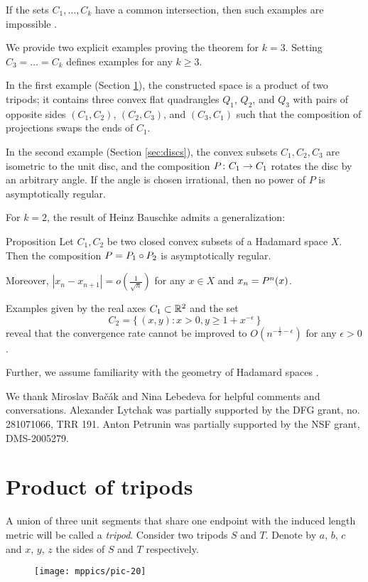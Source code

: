 \documentclass[a4paper,10pt]{article}
\begin{document}
If the sets $C_1,\dots,C_k$ have a common intersection, then such examples are impossible \cite{asymptotic,Bac2,Bac}.

We provide two explicit examples proving the theorem  for  $k=3$.
Setting $C_3=\dots=C_k$ defines examples for any $k\geq 3$.

In the first example (Section \ref{sec:tripods}), the constructed space is a product of two tripods;
it contains three convex flat quadrangles $Q_1$, $Q_2$, and $Q_3$ with pairs of opposite sides $(C_1,C_2)$, $(C_2,C_3)$, and $(C_3,C_1)$ such that the composition of projections swaps the ends of $C_1$.

In the second example (Section \ref{sec:discs}), the convex subsets $C_1,C_2,C_3$ are isometric to the unit disc, and the composition $P\:C_1\z\to C_1$ rotates the disc by an arbitrary angle.
If the angle is chosen irrational, then no power of $P$ is asymptotically regular.
 
For $k=2$, the result of Heinz Bauschke \cite{Bauschke} admits a generalization:

\begin{thm}{Proposition} \label{prop}
Let $C_1,C_2$ be two closed convex subsets of a Hadamard space $X$.
Then the composition $P\z=  P_1\circ P_2$ is asymptotically  regular.

Moreover, $|x_n-x_{n+1}| =o (\frac  {1} {\sqrt n})$ for any  $x\in X$ and $x_n \z= P^n (x)$.
\end{thm}

Examples given by the real axes $C_1 \subset \mathbb{R}^2$ and the set
\[C_2  = \{\,(x,y):x>0, y \geq 1+ x^{ -\epsilon}\,\}\]
reveal that the convergence rate cannot be improved to $O (n^{-\frac 1 2  -\epsilon})$ for any $\epsilon >0$.

\medskip

Further, we assume familiarity with the geometry of Hadamard spaces \cite{BBI,BH,AKP,AKP_inv,ballmannbook}.

We thank Miroslav Bačák and Nina Lebedeva for helpful comments and conversations.
Alexander Lytchak was partially supported by the DFG grant, no. 281071066, TRR 191.
Anton Petrunin was partially supported by the NSF grant, DMS-2005279.

\section{Product of tripods}\label{sec:tripods}

A union of three unit segments that share one endpoint with the induced length metric will be called a \emph{tripod}.
Consider two tripods $S$ and $T$.
Denote by $a$, $b$, $c$ and $x$, $y$, $z$ the sides of $S$ and $T$ respectively.
\begin{figure}[h!]
\vskip0mm
\centering
\texttt{[image: mppics/pic-20]}
\end{figure}
\end{document}

